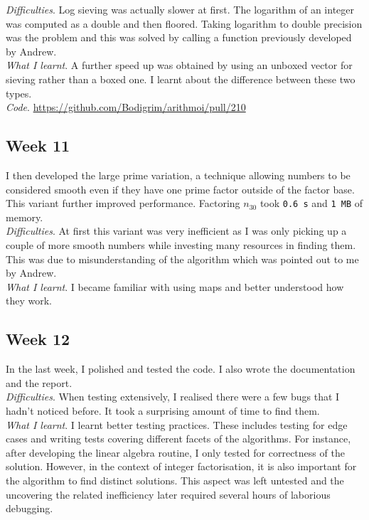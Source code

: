 \documentclass{amsart}
\theoremstyle{definition}
\theoremstyle{remark}
\numberwithin{equation}{section}
\begin{document}
\emph{Difficulties}. Log sieving was actually slower at first. The logarithm of an integer was computed as a double and then floored. Taking logarithm to double precision was the problem and this was solved by calling a function previously developed by Andrew.\\

\emph{What I learnt}. A further speed up was obtained by using an unboxed vector for sieving rather than a boxed one. I learnt about the difference between these two types.\\

\emph{Code}. \url{https://github.com/Bodigrim/arithmoi/pull/210}

\subsection*{Week 11}
I then developed the large prime variation, a technique allowing numbers to be considered smooth even if they have one prime factor outside of the factor base. This variant further improved performance. Factoring $n_{30}$ took \texttt{0.6 s} and \texttt{1 MB} of memory. \\

\emph{Difficulties}. At first this variant was very inefficient as I was only picking up a couple of more smooth numbers while investing many resources in finding them. This was due to misunderstanding of the algorithm which was pointed out to me by Andrew. \\

\emph{What I learnt}. I became familiar with using maps and better understood how they work.

\subsection*{Week 12}
In the last week, I polished and tested the code. I also wrote the documentation and the report.\\

\emph{Difficulties}. When testing extensively, I realised there were a few bugs that I hadn't noticed before. It took a surprising amount of time to find them.\\

\emph{What I learnt}. I learnt better testing practices. These includes testing for edge cases and writing tests covering different facets of the algorithms. For instance, after developing the linear algebra routine, I only tested for correctness of the solution. However, in the context of integer factorisation, it is also important for the algorithm to find distinct solutions. This aspect was left untested and the uncovering the related inefficiency later required several hours of laborious debugging. \\
\end{document}
